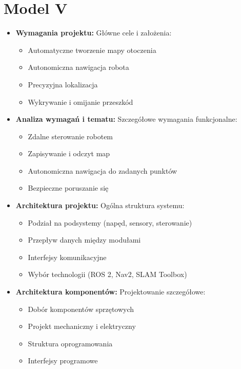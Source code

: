 \documentclass[a4paper,twoside,12pt]{book}
\begin{document}
\section{Model V}

\begin{itemize}
	\item \textbf{Wymagania projektu:} Główne cele i założenia:
	\begin{itemize}
		\item Automatyczne tworzenie mapy otoczenia
		\item Autonomiczna nawigacja robota
		\item Precyzyjna lokalizacja
		\item Wykrywanie i omijanie przeszkód
	\end{itemize}

	\item \textbf{Analiza wymagań i tematu:} Szczegółowe wymagania funkcjonalne:
	\begin{itemize}
		\item Zdalne sterowanie robotem
		\item Zapisywanie i odczyt map
		\item Autonomiczna nawigacja do zadanych punktów
		\item Bezpieczne poruszanie się
	\end{itemize}

	\item \textbf{Architektura projektu:} Ogólna struktura systemu:
	\begin{itemize}
		\item Podział na podsystemy (napęd, sensory, sterowanie)
		\item Przepływ danych między modułami
		\item Interfejsy komunikacyjne
		\item Wybór technologii (ROS 2, Nav2, SLAM Toolbox)
	\end{itemize}

	\item \textbf{Architektura komponentów:} Projektowanie szczegółowe:
	\begin{itemize}
		\item Dobór komponentów sprzętowych
		\item Projekt mechaniczny i elektryczny
		\item Struktura oprogramowania
		\item Interfejsy programowe
	\end{itemize}


\end{itemize}
\end{document}

